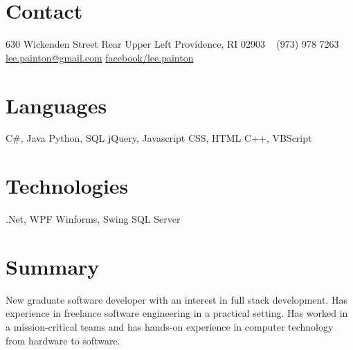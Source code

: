 \documentclass[]{friggeri-cv} %
\begin{document}


\begin{aside} %
\section{\color{brown}Con\color{black}tact}
630 Wickenden Street
Rear Upper Left
Providence, RI 02903
~
(973) 978 7263
~
\href{mailto:lee.painton@gmail.com}{lee.painton@gmail.com}
\href{https://www.facebook.com/lee.painton}{facebook/lee.painton}
\section{\color{violet}Lang\color{black}uages}
{\LARGE C\#, Java}
{\large Python, SQL}
{jQuery, Javascript}
{\small CSS, HTML}
{\footnotesize C++, VBScript}
\section{\color{olive}Tech\color{black}nologies}
{\LARGE .Net, WPF}
{\large Winforms, Swing}
{SQL Server}
\end{aside}


\section{Summary}

New graduate software developer with an interest in full stack development.  Has experience in freelance software engineering in a practical setting.  Has worked in a mission-critical teams and has hands-on experience in computer technology from hardware to software.

\end{document}
